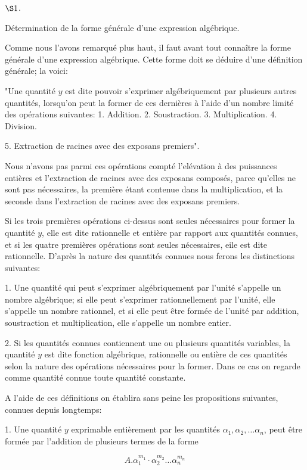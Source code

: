 \documentclass{article}
\begin{document}
\(\S 1\).

Détermination de la forme générale d'une expression algébrique.

Comme nous l'avons remarqué plus haut, il faut avant tout connaître la forme générale d'une expression algébrique. Cette forme doit se déduire d'une définition générale; la voici:

"Une quantité \(y\) est dite pouvoir s'exprimer algébriquement par plusieurs autres quantités, lorsqu'on peut la former de ces dernières à l'aide d'un nombre limité des opérations suivantes:
1. Addition.
2. Soustraction.
3. Multiplication.
4. Division.

5. Extraction de racines avec des exposans premiers".

Nous n'avons pas parmi ces opérations compté l'elévation à des puissances entières et l'extraction de racines avec des exposans composés, parce qu'elles ne sont pas nécessaires, la première étant contenue dans la multiplication, et la seconde dans l'extraction de racines avec des exposans premiers.

Si les trois premières opérations ci-dessus sont seules nécessaires pour former la quantité \(y\), elle est dite rationnelle et entière par rapport aux quantités connues, et si les quatre premières opérations sont seules nécessaires, eile est dite rationnelle. D'après la nature des quantités connues nous ferons les distinctions suivantes:

1. Une quantité qui peut s'exprimer algébriquement par l'unité s'appelle un nombre algébrique; si elle peut s'exprimer rationnellement par l'unité, elle s'appelle un nombre rationnel, et si elle peut être formée de l'unité par addition, soustraction et multiplication, elle s'appelle un nombre entier.

2. Si les quantités connues contiennent une ou plusieurs quantités variables, la quantité \(y\) est dite fonction algébrique, rationnelle ou entière de ces quantités selon la nature des opérations nécessaires pour la former. Dans ce cas on regarde comme quantité connue toute quantité constante.

A l'aide de ces définitions on établira sans peine les propositions suivantes, connues depuis longtemps:

1. Une quantité \(y\) exprimable entièrement par les quantités \(\alpha_{1}, \alpha_{2}, \ldots \alpha_{n}\), peut être formée par l'addition de plusieurs termes de la forme

\[
A . \alpha_{1}^{m_{1}} \cdot \alpha_{2}^{m_{2}} \ldots \alpha_{n}^{m_{n}}
\]
\end{document}
